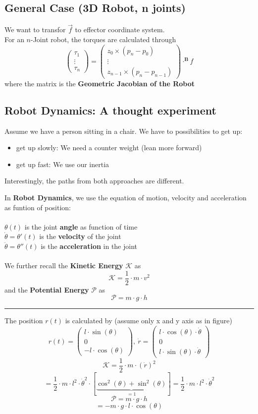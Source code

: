 \documentclass{exerciseBlue}
\begin{document}
\subsection{General Case (3D Robot, n joints)}
We want to transfor $\vec{f}$ to effector coordinate system.\\
For an $n$-Joint robot, the torques are calculated through
$$\begin{pmatrix}
\tau_1\\\vdots\\\tau_n
\end{pmatrix} = \begin{pmatrix}
z_0 \times (p_n - p_0)\\\vdots\\ z_{n-1} \times (p_n - p_{n-1})
\end{pmatrix}\cdot ^\textbf{B}f$$
where the matrix is the \textbf{Geometric Jacobian of the Robot}
\subsection{Robot Dynamics: A thought experiment}
Assume we have a person sitting in a chair. We have to possibilities to get up:
\begin{itemize}
	\item get up slowly: We need a counter weight (lean more forward)
	\item get up fast: We use our inertia
\end{itemize} 
Interestingly, the paths from both approaches are different.\\
\par In \textbf{Robot Dynamics}, we use the equation of motion, velocity and acceleration as funtion of position:\\\\
$\theta(t)$ is the joint \textbf{angle} as function of time\\
$\dot{\theta} = \theta'(t)$ is the \textbf{velocity} of the joint\\
$\ddot{\theta} = \theta''(t)$ is the \textbf{acceleration} in the joint\\\\
We further recall the \textbf{Kinetic Energy} $\mathcal{K}$ as
$$\mathcal{K} = \dfrac{1}{2}\cdot m \cdot v^2$$ and the \textbf{Potential Energy} $\mathcal{P}$ as
$$\mathcal{P} = m\cdot g \cdot h$$
\noindent\rule{\textwidth}{0.3pt}
The position $r(t)$ is calculated by (assume only x and y axis as in figure)
$$r(t)=\begin{pmatrix}
l\cdot \sin (\theta)\\0\\-l\cdot \cos (\theta)
\end{pmatrix}, \ \dot{r}=\begin{pmatrix}
l\cdot \cos (\theta) \cdot \dot{\theta}\\0\\l\cdot \sin (\theta)\cdot \dot{\theta}
\end{pmatrix}$$
$$\mathcal{K} =  \dfrac{1}{2}\cdot m \cdot (\dot{r})^2$$
$$=\dfrac{1}{2}\cdot m\cdot l^2 \cdot \dot{\theta}^2 \cdot [\underbrace{\cos^2(\theta)+\sin^2(\theta)}_{=1}]=\dfrac{1}{2}\cdot m\cdot l^2 \cdot \dot{\theta}^2$$
$$\mathcal{P} = m\cdot g \cdot h$$
$$=-m\cdot g \cdot l\cdot\cos (\theta)$$
\end{document}
